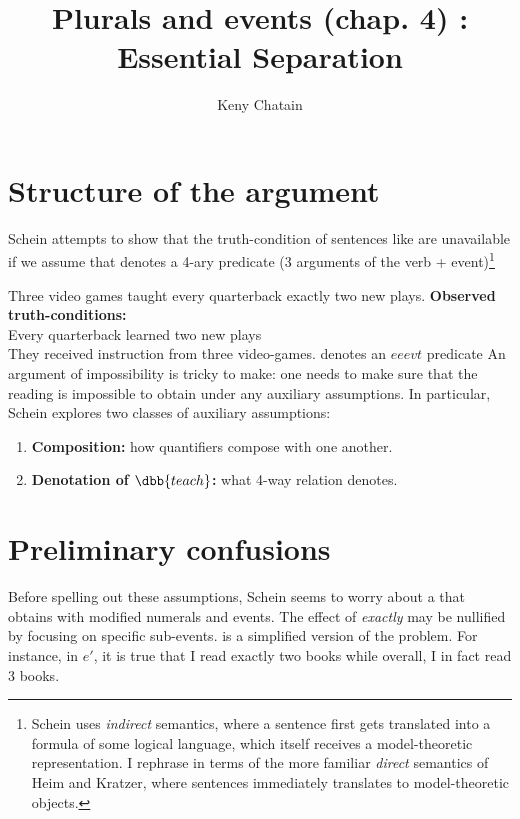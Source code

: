 \documentclass[english]{article}
\title{Plurals and events (chap. 4) : Essential Separation}
\author{Keny Chatain}
\begin{document}
\maketitle

\section*{Structure of the argument}

Schein attempts to show that the truth-condition of sentences like  are unavailable if we assume that  denotes a 4-ary predicate (3 arguments of the verb + event)\footnote{Schein uses \emph{indirect} semantics, where a sentence first gets translated into a formula of some logical language, which itself receives a model-theoretic representation. I rephrase in terms of the more familiar \emph{direct} semantics of Heim and Kratzer, where sentences immediately translates to model-theoretic objects.}

\pex
\a Three video games taught every quarterback exactly two new plays. \label{quat}
\a \textbf{Observed truth-conditions:}\\
Every quarterback learned two new plays\\
They received instruction from three video-games.
\a {} denotes an $eeevt$ predicate
\xe
%
An argument of impossibility is tricky to make: one needs to make sure that the reading is impossible to obtain under any auxiliary assumptions. In particular, Schein explores two classes of auxiliary assumptions:

\begin{enumerate}
\item \textbf{Composition:} how quantifiers compose with one another.
\item \textbf{Denotation of $\dbb{teach}$:} what 4-way relation  denotes.
\end{enumerate}
%

\section{Preliminary confusions}
Before spelling out these assumptions, Schein seems to worry about a  that obtains with modified numerals and events. 
The effect of \emph{exactly} may be nullified by focusing on specific sub-events. \cnextx is a simplified version of the problem. For instance, in $e'$, it is true that I read exactly two books while overall, I in fact read 3 books.
\end{document}
